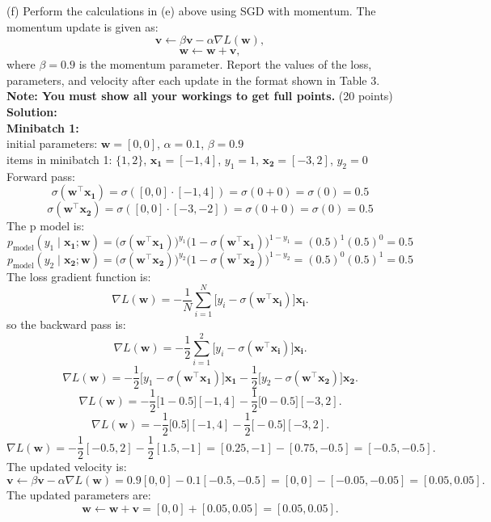 \documentclass[a3paper,12pt]{article} %
\begin{document}
(f)
Perform the calculations in (e) above using SGD with momentum. The momentum update is given as:
\[
\mathbf{v} \gets \beta \mathbf{v} - \alpha \nabla L(\mathbf{w}),
\]
\[
\mathbf{w} \gets \mathbf{w} + \mathbf{v},
\]
where $\beta = 0.9$ is the momentum parameter. Report the values of the loss, parameters, and velocity after each update in the format shown in Table 3. \textbf{Note: You must show all your workings to get full points.}
\hfill (20 points)
\\ \textbf{Solution:}
\\ \textbf{Minibatch 1:}
\\ initial parameters: \(\mathbf{w} = [0, 0]\), \(\alpha = 0.1\), \(\beta = 0.9\)
\\ items in minibatch 1: \(\{1, 2\}\), \(\mathbf{x_1} = [-1, 4]\), \(y_1 = 1\), \(\mathbf{x_2} = [-3, 2]\), \(y_2 = 0\)
\\ Forward pass:
\[
\sigma(\mathbf{w}^\top \mathbf{x_1}) = \sigma([0, 0] \cdot [-1, 4]) = \sigma(0 + 0) = \sigma(0) = 0.5
\]
\[
\sigma(\mathbf{w}^\top \mathbf{x_2}) = \sigma([0, 0] \cdot [-3, -2]) = \sigma(0 + 0) = \sigma(0) = 0.5
\]
The p model is:
\[
p_{\text{model}}(y_1 \mid \mathbf{x_1}; \mathbf{w}) = \big(\sigma(\mathbf{w}^\top \mathbf{x_1})\big)^{y_1} \big(1 - \sigma(\mathbf{w}^\top \mathbf{x_1})\big)^{1-y_1} = (0.5)^1 (0.5)^0 = 0.5
\]
\[
p_{\text{model}}(y_2 \mid \mathbf{x_2}; \mathbf{w}) = \big(\sigma(\mathbf{w}^\top \mathbf{x_2})\big)^{y_2} \big(1 - \sigma(\mathbf{w}^\top \mathbf{x_2})\big)^{1-y_2} = (0.5)^0 (0.5)^1 = 0.5
\]
The loss gradient function is:
\[
\nabla L(\mathbf{w}) = -\frac{1}{N} \sum^N_{i=1} \big[y_i - \sigma(\mathbf{w}^\top \mathbf{x_i})\big] \mathbf{x_i}.
\]
so the backward pass is:
\[
\nabla L(\mathbf{w}) = -\frac{1}{2} \sum^2_{i=1} \big[y_i - \sigma(\mathbf{w}^\top \mathbf{x_i})\big] \mathbf{x_i}.
\]
\[
\nabla L(\mathbf{w}) = -\frac{1}{2} \big[y_1 - \sigma(\mathbf{w}^\top \mathbf{x_1})\big] \mathbf{x_1} - \frac{1}{2} \big[y_2 - \sigma(\mathbf{w}^\top \mathbf{x_2})\big] \mathbf{x_2}.
\]
\[
\nabla L(\mathbf{w}) = -\frac{1}{2} \big[1 - 0.5\big] [-1, 4] - \frac{1}{2} \big[0 - 0.5\big] [-3, 2].
\]
\[
\nabla L(\mathbf{w}) = -\frac{1}{2} \big[0.5] [-1, 4] - \frac{1}{2} \big[-0.5] [-3, 2].
\]
\[
\nabla L(\mathbf{w}) = -\frac{1}{2} [-0.5, 2] - \frac{1}{2} [1.5, -1] = [0.25, -1] - [0.75, -0.5] = [-0.5, -0.5].
\]
The updated velocity is:
\[
\mathbf{v} \gets \beta \mathbf{v} - \alpha \nabla L(\mathbf{w}) = 0.9 [0, 0] - 0.1 [-0.5, -0.5] = [0, 0] - [-0.05, -0.05] = [0.05, 0.05].
\]
The updated parameters are:
\[
\mathbf{w} \gets \mathbf{w} + \mathbf{v} = [0, 0] + [0.05, 0.05] = [0.05, 0.05].
\]
\end{document}

